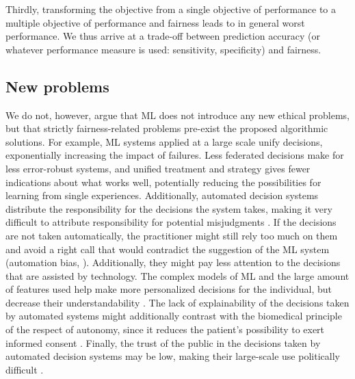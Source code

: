     Thirdly, transforming the objective from a single objective of performance to a multiple objective of performance and fairness leads to in general worst performance.
    We thus arrive at a trade-off between prediction accuracy (or whatever performance measure is used: sensitivity, specificity) and fairness.



\subsection{New problems}
    We do not, however, argue that ML does not introduce any new ethical problems, but that strictly fairness-related problems pre-exist the proposed algorithmic solutions.
    For example, ML systems applied at a large scale unify decisions, exponentially increasing the impact of failures.
    Less federated decisions make for less error-robust systems, and unified treatment and strategy gives fewer indications about what works well, potentially reducing the possibilities for learning from single experiences.
    Additionally, automated decision systems distribute the responsibility for the decisions the system takes, making it very difficult to attribute responsibility for potential misjudgments \cite[p.~6]{Morley2020}.
    If the decisions are not taken automatically, the practitioner might still rely too much on them and avoid a right call that would contradict the suggestion of the ML system \cite[p.~4]{Morley2020} (automation bias, \cite[p.~4]{Rajkomar2018}).
    Additionally, they might pay less attention to the decisions that are assisted by technology.
    The complex models of ML and the large amount of features used help make more personalized decisions for the individual, but decrease their understandability \cite[p.~4]{Rajkomar2018}.
    The lack of explainability of the decisions taken by automated systems might additionally contrast with the biomedical principle of the respect of autonomy, since it reduces the patient's possibility to exert informed consent \cite[p.~346]{Dijkstra2020}.
    Finally, the trust of the public in the decisions taken by automated decision systems may be low, making their large-scale use politically difficult \cite[p.~4]{Morley2020}.
